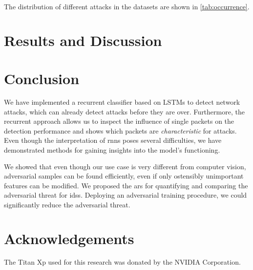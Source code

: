 \documentclass[conference]{IEEEtran}
\begin{document}
The distribution of different attacks in the datasets are shown in \autoref{tab:occurrence}.


\section{Results and Discussion}

\section{Conclusion}

We have implemented a recurrent classifier based on LSTMs to detect network attacks, %
which can already detect attacks before they are over. Furthermore, the recurrent approach allows us to inspect the influence of single packets on the detection performance and shows which packets are \textit{characteristic} for attacks.
Even though the interpretation of \glspl{rnn} poses several difficulties, we have demonstrated methods for gaining insights into the model's functioning.

We showed that even though our use case is very different from computer vision, adversarial samples can be found efficiently, even if only ostensibly unimportant features can be modified. We proposed the \gls{ars} for quantifying and comparing the adversarial threat for \glspl{ids}.
Deploying an adversarial training procedure, we could significantly reduce the adversarial threat.

\section*{Acknowledgements}
The Titan Xp used for this research was donated by the NVIDIA Corporation.

\renewcommand*{\bibfont}{\small}


\end{document}

